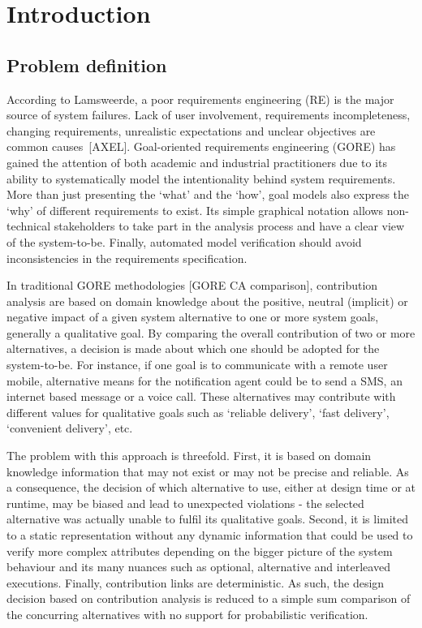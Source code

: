 \chapter{Introduction}\label{ch_introduction}%

\section{Problem definition}

According to Lamsweerde, a poor requirements engineering (RE) is the major source of system failures. Lack of user involvement, requirements incompleteness, changing requirements, unrealistic expectations and unclear objectives are common causes~[AXEL]. Goal-oriented requirements engineering (GORE) has gained the attention of both academic and industrial practitioners due to its ability to systematically model the intentionality behind system requirements. More than just presenting the `what' and the `how', goal models also express the `why' of different requirements to exist. Its simple graphical notation allows non-technical stakeholders to take part in the analysis process and have a clear view of the system-to-be. Finally, automated model verification should avoid inconsistencies in the requirements specification.


In traditional GORE methodologies [GORE CA comparison], contribution  analysis are based on domain knowledge about the positive, neutral (implicit) or negative impact of a given system alternative to one or more system goals, generally a qualitative goal. By  comparing the overall contribution of two or more alternatives, a decision is made about which one should be adopted for the system-to-be. For instance, if one goal is to communicate with a remote user mobile, alternative means for the notification agent could be to send a SMS, an internet based message or a voice call. These alternatives may contribute with different values for qualitative goals such as `reliable delivery', `fast delivery', `convenient delivery', etc. 

The problem with this approach is threefold. First, it is based on domain knowledge information that may not exist or may not be precise and reliable. As a consequence, the decision of which alternative to use, either at design time or at runtime, may be biased and lead to unexpected violations - the selected alternative was actually unable to fulfil its qualitative goals. Second, it is limited to a static representation without any dynamic information that could be used to verify more complex attributes depending on the bigger picture of the system behaviour and its many nuances such as optional, alternative and interleaved executions. Finally, contribution links are deterministic. As such, the design decision based on contribution analysis is reduced to a simple sum comparison of the concurring alternatives with no support for probabilistic verification.

